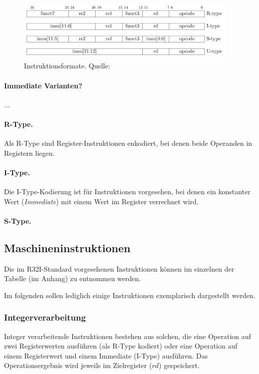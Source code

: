 \begin{figure} [ht]
  \centering
  \includegraphics[width=0.95\textwidth]{Figures/instruction_formats}
  \caption{Instruktionsformate. Quelle: \citep[S. 11]{RISC}}
  \label{fig:instr_types}
\end{figure}

\paragraph{Immediate Varianten?}
...

\paragraph{R-Type.} Als R-Type sind Register-Instruktionen enkodiert, bei denen beide Operanden in Registern liegen.

\paragraph{I-Type.} Die I-Type-Kodierung ist für Instruktionen vorgesehen, bei denen ein konstanter Wert (\textit{Immediate}) mit einem Wert im Register verrechnet wird.

\paragraph{S-Type.}

\subsection{Maschineninstruktionen}
Die im R32I-Standard vorgesehenen Instruktionen können im einzelnen der Tabelle (im Anhang) zu entnommen werden.

Im folgenden sollen lediglich einige Instruktionen exemplarisch dargestellt werden.

\subsubsection{Integerverarbeitung}
Integer verarbeitende Instruktionen bestehen aus solchen, die eine Operation auf zwei Registerwerten ausführen (als R-Type kodiert) oder eine Operation auf einem Registerwert und einem Immediate (I-Type) ausführen. Das Operationsergebnis wird jeweils im Zielregister ($rd$) gespeichert.


